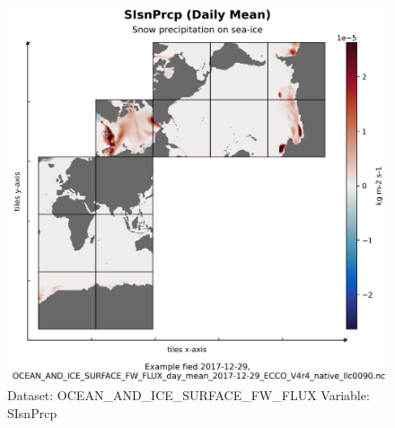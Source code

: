 \begin{figure}[H]
\centering
\includegraphics[scale=0.55]{../images/plots/native_plots/Ocean_and_Sea-Ice_Surface_Freshwater_Fluxes/SIsnPrcp.png}
\caption{Dataset: OCEAN\_AND\_ICE\_SURFACE\_FW\_FLUX Variable: SIsnPrcp}
\label{tab:table-OCEAN_AND_ICE_SURFACE_FW_FLUX_SIsnPrcp-Plot}
\end{figure}
\pagebreak
